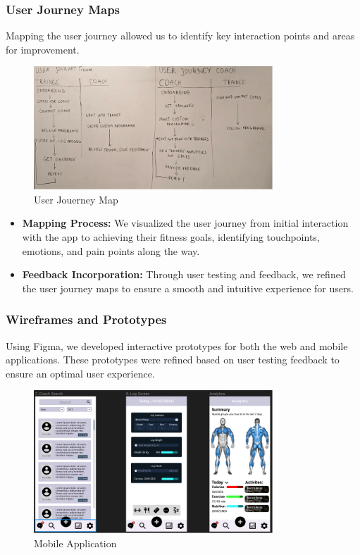 \subsubsection{User Journey Maps}
Mapping the user journey allowed us to identify key interaction points and areas for improvement.

\begin{figure}[H]
    \centering
    \includegraphics[width=0.8\textwidth]{images/userjourney.png}
    \caption{User Jouerney Map}
    \label{fig:userjourney}
  \end{figure}


\begin{itemize}
  \item \textbf{Mapping Process:} We visualized the user journey from initial interaction with the app to achieving their fitness goals, identifying touchpoints, emotions, and pain points along the way.
  
  \item \textbf{Feedback Incorporation:} Through user testing and feedback, we refined the user journey maps to ensure a smooth and intuitive experience for users.
\end{itemize}

\subsubsection{Wireframes and Prototypes}
Using Figma, we developed interactive prototypes for both the web and mobile applications. These prototypes were refined based on user testing feedback to ensure an optimal user experience.

\begin{figure}[H]
    \centering
    \includegraphics[width=0.8\textwidth]{images/figma.png}
    \caption{Mobile Application}
    \label{fig:figma}
  \end{figure}

